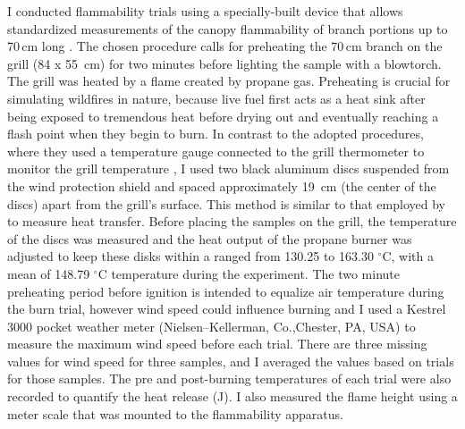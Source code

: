 \documentclass{ttuthes2007}
\begin{document}
I conducted flammability trials using a specially-built device that allows standardized measurements of the canopy flammability of branch portions up to 70\,cm long \citep{jaureguiberry2011device}. The chosen procedure calls for preheating the 70\,cm branch on the grill (84 x 55 \,cm) for two minutes before lighting the sample with a blowtorch. The grill was heated by a flame created by propane gas. Preheating is crucial for simulating wildfires in nature, because live fuel first acts as a heat sink after being exposed to tremendous heat before drying out and eventually reaching a flash point when they begin to burn. In contrast to the adopted procedures, where they used a temperature gauge connected to the grill thermometer to monitor the grill temperature \citep{jaureguiberry2011device}, I used two black aluminum discs  suspended from the wind protection shield and spaced approximately 19 \,cm (the center of the discs) apart from the grill's surface. This method is similar to that employed by \citet{gao2022burn} to measure heat transfer. Before placing the samples on the grill, the temperature of the discs was measured and the heat output of the propane burner was adjusted to keep these disks within a ranged from 130.25 to 163.30 $^{\circ}$C, with a mean of 148.79 $^{\circ}$C temperature  during the experiment. The two minute preheating period before ignition is intended to equalize air temperature during the burn trial, however wind speed could influence burning and I used
a Kestrel 3000 pocket weather meter (Nielsen–Kellerman, Co.,Chester, PA, USA) to
measure the maximum wind speed before each trial. There are three missing values for wind speed for three samples, and I averaged the values based on trials for those samples.
The pre and post-burning temperatures of each trial were also recorded to quantify the heat release (J). I also measured the flame height using a meter scale that was mounted to the flammability apparatus.

\end{document}
